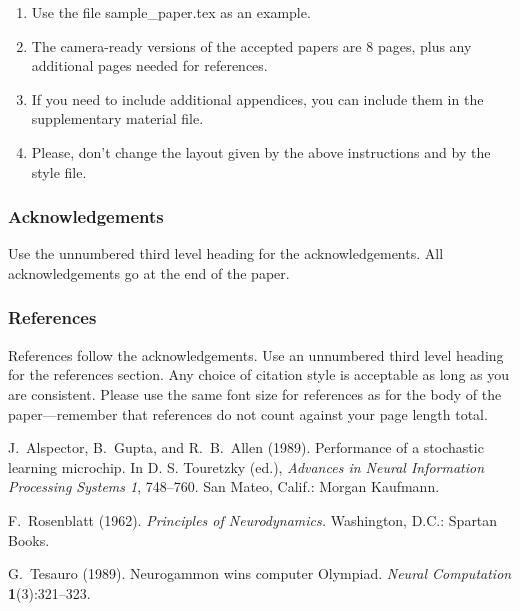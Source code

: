 \documentclass[twoside]{article}
\theoremstyle{plain}
\theoremstyle{definition}
\begin{document}
\begin{enumerate}
    \item Use the file sample\_paper.tex as an example.

    \item The camera-ready versions of the accepted papers are 8
      pages, plus any additional pages needed for references.

    \item If you need to include additional appendices,
      you can include them in the supplementary
      material file.

    \item Please, don't change the layout given by the above
      instructions and by the style file.

\end{enumerate}

\subsubsection*{Acknowledgements}

Use the unnumbered third level heading for the acknowledgements.  All
acknowledgements go at the end of the paper.

\subsubsection*{References}

References follow the acknowledgements.  Use an unnumbered third level
heading for the references section.  Any choice of citation style is
acceptable as long as you are consistent.  Please use the same font
size for references as for the body of the paper---remember that
references do not count against your page length total.

\begin{thebibliography}{}
\setlength{\itemindent}{-\leftmargin}
\makeatletter\renewcommand{\@biblabel}[1]{}\makeatother
\bibitem{} J.~Alspector, B.~Gupta, and R.~B.~Allen (1989).
    \newblock Performance of a stochastic learning microchip.
    \newblock In D. S. Touretzky (ed.),
    \textit{Advances in Neural Information Processing Systems 1}, 748--760.
    San Mateo, Calif.: Morgan Kaufmann.

\bibitem{} F.~Rosenblatt (1962).
    \newblock \textit{Principles of Neurodynamics.}
    \newblock Washington, D.C.: Spartan Books.

\bibitem{} G.~Tesauro (1989).
    \newblock Neurogammon wins computer Olympiad.
    \newblock \textit{Neural Computation} \textbf{1}(3):321--323.
\end{thebibliography}
\end{document}
